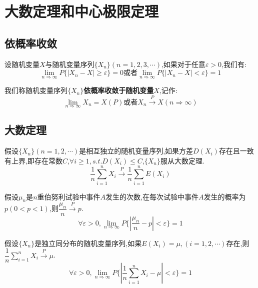 \chapter{大数定理和中心极限定理}
\section{依概率收敛}
\begin{definition}[依概率收敛]
	设随机变量$X$与随机变量序列$\{X_{n}\}(n=1,2,3,\cdots)$,如果对于任意$\varepsilon>0$,我们有: 
	$$\lim\limits_{n\Rightarrow \infty}P\{|X_{n}-X|\geq \varepsilon\}=0\text{或者}\lim\limits_{n\Rightarrow \infty}P\{|X_{n}-X|<\varepsilon\}=1$$
	
	我们称随机变量序列$\{X_{n}\}$\textbf{依概率收敛于随机变量}$X$,记作: 
	$$\lim\limits_{n\Rightarrow \infty}X_{n}=X(P)\text{或者}X_{n}\stackrel{P}{\longrightarrow}X(n\Rightarrow \infty)$$
\end{definition}
\section{大数定理}
\begin{theorem}[切比雪夫大数定理]
	假设$\{X_{n}\}(n=1,2,\cdots)$是相互独立的随机变量序列,如果方差$D(X_{i})$存在且一致有上界,即存在常数$C$,$\forall i\geq 1, s.t. D(X_{i})\leq C$,$\{X_{n}\}$服从大数定理.
	$$\dfrac{1}{n}\sum\limits_{i=1}^{n}X_{i}\stackrel{P}{\longrightarrow}\dfrac{1}{n}\sum\limits_{i=1}^{n}E(X_{i})$$
\end{theorem}
\begin{theorem}[伯努利大数定理]
	假设$\mu_{n}$是$n$重伯努利试验中事件$A$发生的次数,在每次试验中事件$A$发生的概率为$p(0<p<1)$,则$\dfrac{\mu_{n}}{n}\stackrel{P}{\longrightarrow}p$.
	$$\forall \varepsilon>0,\lim\limits_{n\Rightarrow \infty}P\{|\dfrac{\mu_{n}}{n}-p|<\varepsilon\}=1$$
\end{theorem}
\begin{theorem}[辛钦大数定理]
	假设$\{X_{n}\}$是独立同分布的随机变量序列,如果$E(X_{i})=\mu,(i=1,2,\cdots)$存在,则$\dfrac{1}{n}\sum\limits_{i=1}^{n}X_{i}\stackrel{P}{\longrightarrow}\mu$.
	$$\forall \varepsilon>0,\lim\limits_{n\Rightarrow \infty}P\{|\dfrac{1}{n}\sum\limits_{i=1}^{n}X_{i}-\mu|<\varepsilon\}=1$$
\end{theorem}

